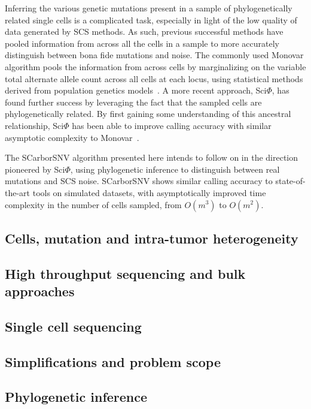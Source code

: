 \documentclass[../main.tex]{subfiles}
\begin{document}
Inferring the various genetic mutations present in a sample of phylogenetically related single cells is a complicated task, especially in light of the low quality of data generated by SCS methods.
As such, previous successful methods have pooled information from across all the cells in a sample to more accurately distinguish between bona fide mutations and noise.
The commonly used Monovar algorithm pools the information from across cells by marginalizing on the variable total alternate allele count across all cells at each locus, using statistical methods derived from population genetics models~\cite{monovar}.
A more recent approach, Sci$\Phi$, has found further success by leveraging the fact that the sampled cells are phylogenetically related.
By first gaining some understanding of this ancestral relationship, Sci$\Phi$ has been able to improve calling accuracy with similar asymptotic complexity to Monovar~\cite{sciphi}.

The SCarborSNV algorithm presented here intends to follow on in the direction pioneered by Sci$\Phi$, using phylogenetic inference to distinguish between real mutations and SCS noise.
SCarborSNV shows similar calling accuracy to state-of-the-art tools on simulated datasets, with asymptotically improved time complexity in the number of cells sampled, from $O(m^3)$ to $O(m^2)$.

\subsection{Cells, mutation and intra-tumor heterogeneity}


\subsection{High throughput sequencing and bulk approaches}


\subsection{Single cell sequencing}


\subsection{Simplifications and problem scope}


\subsection{Phylogenetic inference}

 
\end{document}
